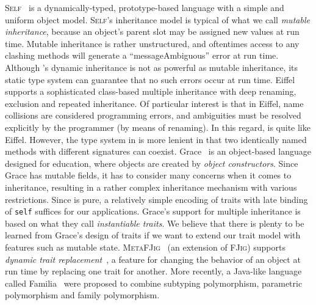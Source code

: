 \textsc{Self}~\citep{ungar1988self} is a dynamically-typed, prototype-based
language with a simple and uniform object model. \textsc{Self}'s inheritance
model is typical of what we call \textit{mutable inheritance}, because an
object's parent slot may be assigned new values at run time. Mutable inheritance
is rather unstructured, and oftentimes access to any clashing methods will
generate a ``messageAmbiguous'' error at run time. Although \sedel's dynamic
inheritance is not as powerful as mutable inheritance, its static type system
can guarantee that no such errors occur at run time.
Eiffel~\citep{meyer1987eiffel} supports a sophisticated class-based multiple
inheritance with deep renaming, exclusion and repeated inheritance. Of
particular interest is that in Eiffel, name collisions are considered
programming errors, and ambiguities must be resolved explicitly by the
programmer (by means of renaming). In this regard, \sedel is quite like Eiffel.
However, the type system in \sedel is more lenient in that two identically named
methods with different signatures can coexist.
Grace~\citep{DBLP:journals/jot/NobleBBHJ17, DBLP:conf/ecoop/0002HNB16} is an
object-based language designed for education, where objects are created by
\textit{object constructors}.
Since Grace has mutable fields, it has to consider
many concerns when it comes to inheritance, resulting in a rather complex
inheritance mechanism with various restrictions.
Since \sedel is pure, a relatively simple
encoding of traits with late binding of \lstinline{self}
suffices for our applications. Grace's support for multiple inheritance is
based on what they call \emph{instantiable traits}.
We believe that there is plenty to be learned from Grace's design of traits if
we want to extend our trait model with features such as mutable state.
\textsc{MetaFJig}~\citep{SERVETTO2014219} (an extension of \textsc{FJig})
supports \textit{dynamic trait replacement}~\citep{chai_trait, BETTINI2013907,
  Ducasse_2006}, a feature for changing the behavior of an object at run time by
replacing one trait for another. More recently, a Java-like language called
Familia~\citep{Zhang_2017} were proposed to combine subtyping polymorphism,
parametric polymorphism and family polymorphism.


